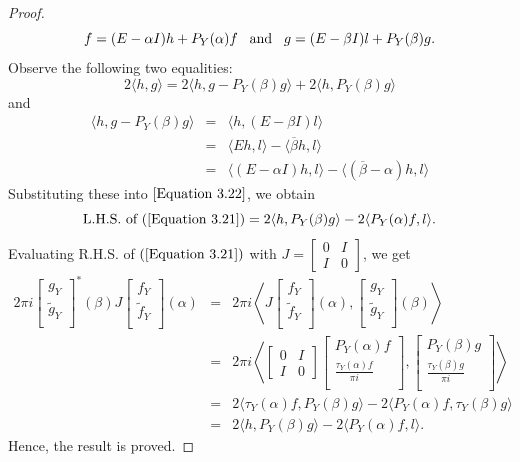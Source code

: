 \documentclass [12pt,reqno]{amsart}
\numberwithin{equation}{subsection}
\numberwithin{equation}{section}
\begin{document}
\begin{proof}
\begin{equation}
f=(E-\alpha I)h +P_Y(\alpha)f \hspace{0.3cm}\text{and} \hspace{0.3cm}
g=(E-\beta I)l+P_Y(\beta)g.
\end{equation}
Observe the following two equalities: $$ 2\langle h,g\rangle =2 \langle h,g-P_Y(\beta)g \rangle+ 2\langle h, P_Y(\beta)g \rangle$$ and \begin{eqnarray*}
\langle h,g-P_Y(\beta)g \rangle &=& \langle h,(E- \beta I)l \rangle \\
&=& \langle Eh,l \rangle- \langle \overline{\beta} h,l\rangle\\
&=& \langle (E-\alpha I)h,l \rangle- \langle (\overline{\beta}-\alpha) h,l\rangle 
\end{eqnarray*} Substituting these into $\eqref{Equation 3.22}$, we obtain $$\text{L.H.S. of $(\ref{Equation 3.21})$}=2\langle h,P_Y(\beta)g \rangle - 2 \langle P_Y(\alpha)f,l \rangle.$$ 
Evaluating R.H.S. of $(\ref{Equation 3.21})$ with $J= \begin{bmatrix}
0 & I \\ 
I & 0
\end{bmatrix}$, we get 
\begin{eqnarray*}
2\pi i  \begin{bmatrix} 
	g_Y  \\
	\tilde{g}_Y\\
	\end{bmatrix}^*(\beta) J  \begin{bmatrix} 
	f_Y  \\
	\tilde{f}_Y \\
	\end{bmatrix}(\alpha) 
&=& 2\pi i  \left\langle J \begin{bmatrix} 
	f_Y  \\
	\tilde{f}_Y \\
	\end{bmatrix}(\alpha) ,  \begin{bmatrix} 
	g_Y  \\
	\tilde{g}_Y \\
	\end{bmatrix}(\beta) \right\rangle \\
&=&	 2 \pi i  \left\langle  \begin{bmatrix}
0 & I \\ 
I & 0
\end{bmatrix} 
\begin{bmatrix} 
	P_Y(\alpha)f  \\
	\frac{\tau_Y(\alpha)f}{\pi i} \\
	\end{bmatrix} ,  \begin{bmatrix} 
	P_Y(\beta)g  \\
	\frac{\tau_Y(\beta)g}{\pi i} \\
	\end{bmatrix} \right\rangle \\
&=& 2\langle \tau_Y(\alpha)f,P_Y(\beta)g \rangle - 2 \langle P_Y(\alpha)f,\tau_Y(\beta)g \rangle\\
&=& 2\langle h,P_Y(\beta)g \rangle - 2 \langle P_Y(\alpha)f,l \rangle.
\end{eqnarray*}
Hence, the result is proved.
\end{proof}
\end{document}
